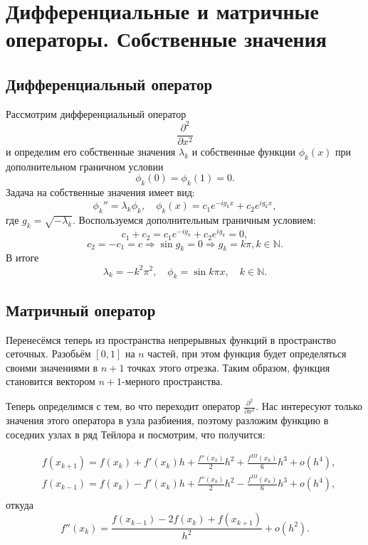 \documentclass[a4paper,12pt]{article}
\begin{document}
\section{Дифференциальные и матричные операторы. Собственные значения}
\subsection{Дифференциальный оператор}
	Рассмотрим дифференциальный оператор
	\[
		\frac{\partial^2}{\partial x^2}
	\]
	и определим его собственные значения \( \lambda_k \) и собственные функции
	\( \phi_k(x) \) при дополнительном граничном условии
	\[
		\phi_k(0) = \phi_k(1) = 0.
	\]
	Задача на собственные значения имеет вид:
	\[
		\phi_k'' = \lambda_k\phi_k,\quad
		\phi_k(x) = c_1e^{-ig_k x} + c_2e^{ig_k x},
	\]
	где \( g_k = \sqrt{-\lambda_k} \). Воспользуемся дополнительным граничным
	условием:
	\[
		c_1 + c_2 = c_1e^{-ig_k} + c_2e^{ig_k} = 0,
	\]
	\[
		c_2 = -c_1 = c \Rightarrow \sin g_k = 0 \Rightarrow g_k = k\pi,
		k\in\mathbb{N}.
	\]
	В итоге
	\[
		\lambda_k = -k^2\pi^2,\quad \phi_k = \sin k\pi x,\quad k\in\mathbb{N}.
	\]

\subsection{Матричный оператор}
	Перенесёмся теперь из пространства непрерывных функций в пространство сеточных. Разобьём \( [0,1] \) на \(n\) частей, при этом функция будет определяться своими значениями в \( n+1 \) точках этого отрезка. Таким образом, функция становится вектором \( n+1 \)-мерного пространства.

	Теперь определимся с тем, во что переходит оператор \( \frac{\partial^2}{\partial x^2} \). Нас интересуют только значения этого оператора в узла разбиения, поэтому разложим функцию в соседних узлах в ряд Тейлора и посмотрим, что получится:

	\begin{align*}
		& f(x_{k+1}) = f(x_k) + f'(x_k)h + \frac{f''(x_k)}{2}h^2 + \frac{f^{III}(x_k)}{6}h^3 + o(h^4),\\
		& f(x_{k-1}) = f(x_k) - f'(x_k)h + \frac{f''(x_k)}{2}h^2 - \frac{f^{III}(x_k)}{6}h^3 + o(h^4),\\
	\end{align*}
	откуда
	\[
		f''(x_k) = \frac{f(x_{k-1}) - 2f(x_k)  + f(x_{k+1})}{h^2} + o(h^2).
	\]
\end{document}
